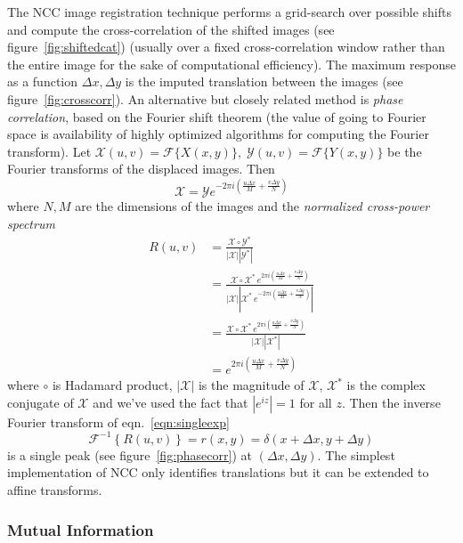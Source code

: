 
%
The NCC image registration technique performs a grid-search over possible shifts and compute the cross-correlation of the shifted images (see figure~\ref{fig:shiftedcat}) (usually over a fixed cross-correlation window rather than the entire image for the sake of computational efficiency).
%
The maximum response as a function \(\Delta x, \Delta y\) is the imputed translation between the images (see figure~\ref{fig:crosscorr}).
%
An alternative but closely related method is \textit{phase correlation}, based on the Fourier shift theorem  (the value of going to Fourier space is availability of highly optimized algorithms for computing the Fourier transform).
%
Let \(\mathcal{X}(u,v) = \mathcal{F}\{X(x,y)\}, \; \mathcal{Y}(u,v) = \mathcal{F}\{Y(x,y)\}\) be the Fourier transforms of the displaced images.
%
Then
\[
	\mathcal{X} = \mathcal{Y}  e^{-2 \pi i (\frac{u \Delta x}{M} + \frac{v \Delta y}{N})}
\]
where \(N,M\) are the dimensions of the images
%
and the \textit{normalized cross-power spectrum}
\begin{align}
	R(u,v) & = \frac{\mathcal{X}\circ \mathcal{Y}^{*}}{|\mathcal{X} ||\mathcal{Y}^{*} |} \\
	       & = \frac{\mathcal{X}\circ \mathcal{X}^{*} \, e^{2 \pi i (\frac{u \Delta x}{M} + \frac{v \Delta y}{N})}}{|\mathcal{X} ||\mathcal{X}^{*} \, e^{-2 \pi i (\frac{u \Delta x}{M} + \frac{v \Delta y}{N})} |} \\
	       & = \frac{\mathcal{X}\circ \mathcal{X}^{*} \, e^{2 \pi i (\frac{u \Delta x}{M} + \frac{v \Delta y}{N})}}{|\mathcal{X} ||\mathcal{X}^{*} |} \\
	       & = e^{2 \pi i (\frac{u \Delta x}{M} + \frac{v \Delta y}{N})} \label{eqn:singleexp}
\end{align}
where \(\circ\) is Hadamard product, \(|\mathcal{X}|\) is the magnitude of \(\mathcal{X}\), \(\mathcal{X}^*\) is the complex conjugate of \(\mathcal{X}\) and we've used the fact that \(|e^{iz}|=1\) for all \(z\).
%
Then the inverse Fourier transform of eqn.~\eqref{eqn:singleexp}
\[
	\mathcal{F}^{-1}\left\{ R(u,v) \right\} = r(x,y) = \delta(x + \Delta x, y + \Delta y)
\]
is a single peak (see figure~\ref{fig:phasecorr}) at \((\Delta x, \Delta y)\).
%
The simplest implementation of NCC only identifies translations but it can be extended to affine transforms\cite{berthilsson1998}.

\subsubsection{Mutual Information}

